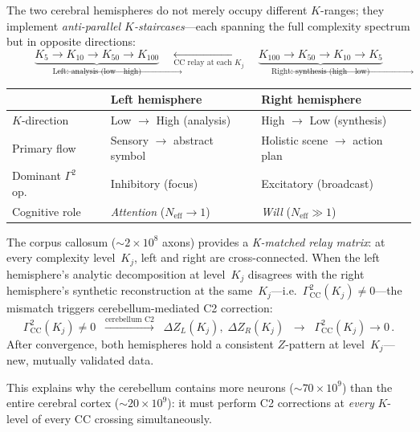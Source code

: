 \documentclass[aps,pre,twocolumn,superscriptaddress,floatfix]{revtex4-2}
\begin{document}
The two cerebral hemispheres do not merely occupy
different $K$-ranges; they implement
\emph{anti-parallel $K$-staircases}---each spanning
the full complexity spectrum but in opposite
directions:
\begin{equation}
\underbrace{
  K_5 \!\to\! K_{10} \!\to\! K_{50} \!\to\! K_{100}
}_{\text{Left: analysis (low$\to$high)}}
\quad
\underset{\text{CC relay at each }K_j}
  {\longleftrightarrow}
\quad
\underbrace{
  K_{100} \!\to\! K_{50} \!\to\! K_{10} \!\to\! K_5
}_{\text{Right: synthesis (high$\to$low)}}
\label{eq:cc-relay}
\end{equation}
\begin{center}
\begin{tabular}{@{}lll@{}}
\toprule
& Left hemisphere & Right hemisphere \\
\midrule
$K$-direction &
  Low $\to$ High (analysis) &
  High $\to$ Low (synthesis) \\
Primary flow &
  Sensory $\to$ abstract symbol &
  Holistic scene $\to$ action plan \\
Dominant $\Gamma^2$ op.\ &
  Inhibitory (focus) &
  Excitatory (broadcast) \\
Cognitive role &
  \emph{Attention} ($N_{\text{eff}} \to 1$) &
  \emph{Will} ($N_{\text{eff}} \gg 1$) \\
\bottomrule
\end{tabular}
\end{center}
The corpus callosum ($\sim 2 \times 10^8$ axons)
provides a \emph{K-matched relay matrix}: at
every complexity level~$K_j$, left and right are
cross-connected.
When the left hemisphere's analytic decomposition
at level~$K_j$ disagrees with the right hemisphere's
synthetic reconstruction at the same~$K_j$---i.e.\
$\Gamma^2_{\text{CC}}(K_j) \neq 0$---the
mismatch triggers cerebellum-mediated C2
correction:
\begin{equation}
  \Gamma^2_{\text{CC}}(K_j) \neq 0
  \;\;\xrightarrow{\text{cerebellum C2}}\;\;
  \Delta Z_L(K_j),\;\Delta Z_R(K_j)
  \;\;\longrightarrow\;\;
  \Gamma^2_{\text{CC}}(K_j) \to 0\,.
  \label{eq:cc-cerebellum-loop}
\end{equation}
After convergence, both hemispheres hold a
consistent $Z$-pattern at level~$K_j$---new,
mutually validated data.

This explains why the cerebellum contains more
neurons ($\sim\!70 \times 10^9$) than the entire
cerebral cortex ($\sim\!20 \times 10^9$): it must
perform C2 corrections at \emph{every}
$K$-level of every CC crossing simultaneously.
\end{document}
